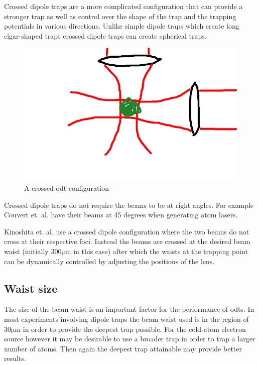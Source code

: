 Crossed dipole traps\cite{barrett_all-optical_2001, xiong_evaporative_2010, arnold_all-optical_2011, fu_bose-einstein_2011} are a more complicated configuration that can provide a stronger trap as well as control over the shape of the trap and the trapping potentials in various directions. Unlike simple dipole traps which create long cigar-shaped traps crossed dipole traps can create spherical traps.

\begin{figure}[h]
	\centering
	\includegraphics[scale=0.32]{figs/crosseddipoletrap.jpg}
	\caption[Title]{A crossed \gls{odt} configuration}
	\label{figs/MOT.pdf}
\end{figure}

Crossed dipole traps do not require the beams to be at right angles. For example Couvert et. al. \cite{couvert_quasi-monomode_2008} have their beams at 45 degrees when generating atom lasers.

Kinoshita et. al.\cite{kinoshita_all-optical_2005} use a crossed dipole configuration where the two beams do not cross at their respective foci. Instead the beams are crossed at the desired beam waist (initially $\mathrm{300\mu m}$ in this case) after which the waists at the trapping point can be dynamically controlled by adjusting the positions of the lens.


\subsection{Waist size}
The size of the beam waist is an important factor for the performance of \glspl{odt}. In most experiments involving dipole traps the beam waist used is in the region of $\mathrm{30\mu m}$ in order to provide the deepest trap possible. For the cold-atom electron source however it may be desirable to use a broader trap in order to trap a larger number of atoms. Then again the deepest trap attainable may provide better results.

